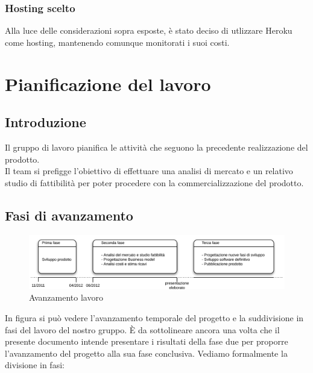 \subsection{Hosting scelto}
Alla luce delle considerazioni sopra esposte, è stato deciso di utlizzare Heroku come hosting, mantenendo comunque monitorati i suoi costi.









\chapter{Pianificazione del lavoro}
\label{pianificazioneDelLavoro}

\section{Introduzione}
Il gruppo di lavoro pianifica le attività che seguono la precedente realizzazione del prodotto.\\
Il team si prefigge l'obiettivo di effettuare una analisi di mercato e un relativo studio di fattibilità per poter procedere con la commercializzazione del prodotto.\\

\section{Fasi di avanzamento}

\vspace*{0.5cm}

\begin{figure}[H]
\centering
\includegraphics[scale=0.7]{images/cap3/avanzamento.png}
\caption{Avanzamento lavoro}
\end{figure} 

\vspace*{0.5cm}

In figura  si può vedere l'avanzamento temporale del progetto e la suddivisione in fasi del lavoro del nostro gruppo. È da sottolineare ancora una volta che il presente documento intende presentare i risultati della fase due per proporre l'avanzamento del progetto alla sua fase conclusiva. Vediamo formalmente la divisione in fasi: \\

